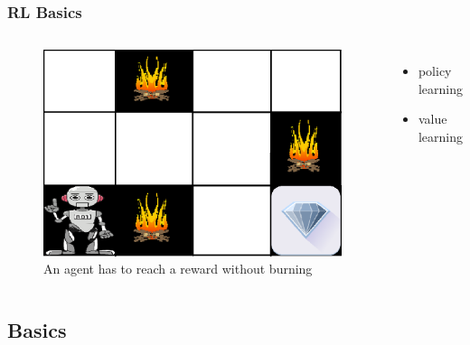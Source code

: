 \documentclass{beamer}
\begin{document}
\begin{frame}
    \frametitle{RL Basics}
    \begin{columns}
    \begin{figure}
    \includegraphics[width=.7\linewidth]{RL_robot.png}
    \caption{An agent has to reach a reward without burning\footnotemark}
    \end{figure}
    \begin{itemize}
        \item policy learning
        \item value learning
    \end{itemize}
    \end{columns}
\end{frame}
\subsection{Basics}
\end{document}
